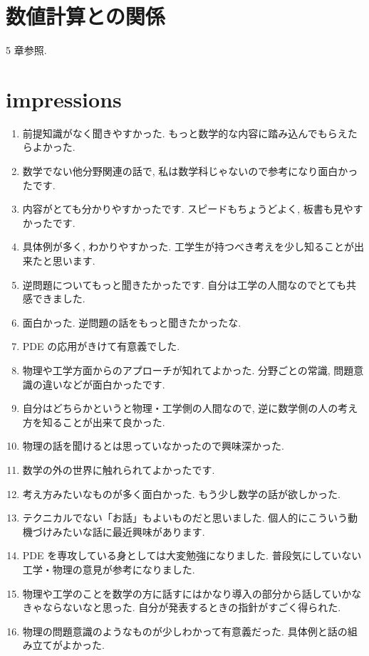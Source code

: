 \documentclass[openany, a4paper, oneside]{jsbook}
\begin{document}
\section{数値計算との関係}

\cite{KimYamamoto1} 5 章参照.
\section{impressions}

\begin{enumerate}
\item 前提知識がなく聞きやすかった.
もっと数学的な内容に踏み込んでもらえたらよかった.
\item 数学でない他分野関連の話で, 私は数学科じゃないので参考になり面白かったです.
\item 内容がとても分かりやすかったです.
スピードもちょうどよく, 板書も見やすかったです.
\item 具体例が多く, わかりやすかった.
工学生が持つべき考えを少し知ることが出来たと思います.
\item 逆問題についてもっと聞きたかったです. 自分は工学の人間なのでとても共感できました.
\item 面白かった. 逆問題の話をもっと聞きたかったな.
\item PDE の応用がきけて有意義でした.
\item 物理や工学方面からのアプローチが知れてよかった.
分野ごとの常識, 問題意識の違いなどが面白かったです.
\item 自分はどちらかというと物理・工学側の人間なので, 逆に数学側の人の考え方を知ることが出来て良かった.
\item 物理の話を聞けるとは思っていなかったので興味深かった.
\item 数学の外の世界に触れられてよかったです.
\item 考え方みたいなものが多く面白かった. もう少し数学の話が欲しかった.
\item テクニカルでない「お話」もよいものだと思いました. 個人的にこういう動機づけみたいな話に最近興味があります.
\item PDE を専攻している身としては大変勉強になりました.
普段気にしていない工学・物理の意見が参考になりました.
\item 物理や工学のことを数学の方に話すにはかなり導入の部分から話していかなきゃならないなと思った.
自分が発表するときの指針がすごく得られた.
\item 物理の問題意識のようなものが少しわかって有意義だった.
具体例と話の組み立てがよかった.
\end{enumerate}
\end{document}
